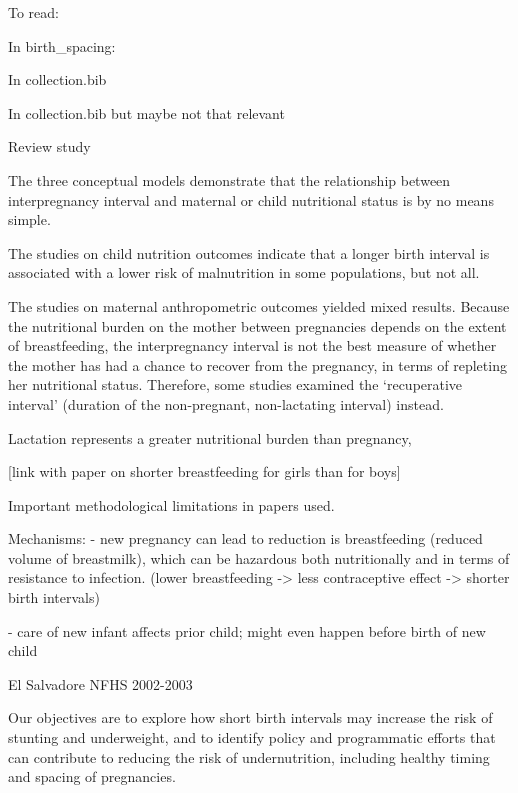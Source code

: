 
To read:

In birth_spacing:


In collection.bib
\citep{Rafalitnanana2000} 
\citep{Rahman1993}
\citep{Jayachandran2017}
\citep{Jayachandran2017a}
\citep{Lambert2016}


In collection.bib but maybe not that relevant
\citep{Basu2010} 
\citep{dasgupta95} 
\citep{Kugler2017}



\citet{Dewey2007}

Review study

The three conceptual models demonstrate that the relationship between
interpregnancy interval and maternal or child nutritional status is by
no means simple.

The studies on child nutrition outcomes indicate that a longer birth
interval is associated with a lower risk of malnutrition in some
populations, but not all.

The studies on maternal anthropometric outcomes yielded mixed results.
Because the nutritional burden on the mother between pregnancies depends
on the extent of breastfeeding, the interpregnancy interval is not the
best measure of whether the mother has had a chance to recover from the
pregnancy, in terms of repleting her nutritional status. Therefore, some
studies examined the ‘recuperative interval’ (duration of the
non-pregnant, non-lactating interval) instead.

Lactation represents a greater nutritional burden than pregnancy,

[link with paper on shorter breastfeeding for girls than for boys]

Important methodological limitations in papers used.

Mechanisms: 
- new pregnancy can lead to reduction is breastfeeding (reduced volume of breastmilk), which
can be hazardous both nutritionally and in terms of resistance to infection.
(lower breastfeeding -> less contraceptive effect -> shorter birth intervals)

- care of new infant affects prior child; might even happen before birth of new child

\citet{Gribble2009}

El Salvadore NFHS 2002-2003

Our objectives are to explore how short birth intervals may increase the
risk of stunting and underweight, and to identify policy and
programmatic efforts that can contribute to reducing the risk of
undernutrition, including healthy timing and spacing of pregnancies.

